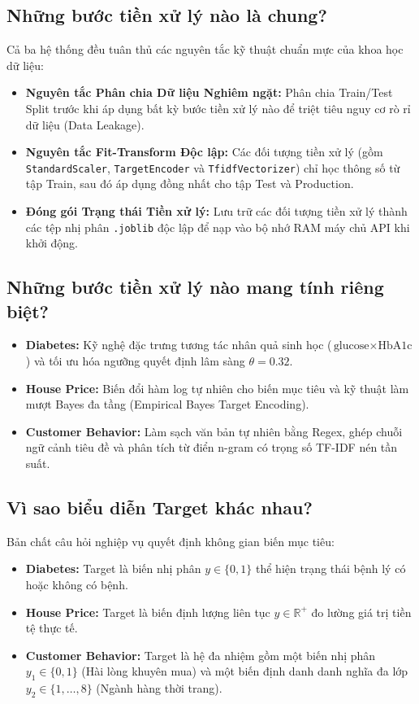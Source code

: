 \documentclass[12pt,a4paper]{report}
\begin{document}
\subsection{Những bước tiền xử lý nào là chung?}
Cả ba hệ thống đều tuân thủ các nguyên tắc kỹ thuật chuẩn mực của khoa học dữ liệu:
\begin{itemize}[leftmargin=2em]
    \item \textbf{Nguyên tắc Phân chia Dữ liệu Nghiêm ngặt:} Phân chia Train/Test Split trước khi áp dụng bất kỳ bước tiền xử lý nào để triệt tiêu nguy cơ rò rỉ dữ liệu (Data Leakage).
    \item \textbf{Nguyên tắc Fit-Transform Độc lập:} Các đối tượng tiền xử lý (gồm \texttt{StandardScaler}, \texttt{TargetEncoder} và \texttt{TfidfVectorizer}) chỉ học thông số từ tập Train, sau đó áp dụng đồng nhất cho tập Test và Production.
    \item \textbf{Đóng gói Trạng thái Tiền xử lý:} Lưu trữ các đối tượng tiền xử lý thành các tệp nhị phân \texttt{.joblib} độc lập để nạp vào bộ nhớ RAM máy chủ API khi khởi động.
\end{itemize}

\subsection{Những bước tiền xử lý nào mang tính riêng biệt?}
\begin{itemize}[leftmargin=2em]
    \item \textbf{Diabetes:} Kỹ nghệ đặc trưng tương tác nhân quả sinh học ($\text{glucose} \times \text{HbA1c}$) và tối ưu hóa ngưỡng quyết định lâm sàng $\theta = 0.32$.
    \item \textbf{House Price:} Biến đổi hàm log tự nhiên cho biến mục tiêu và kỹ thuật làm mượt Bayes đa tầng (Empirical Bayes Target Encoding).
    \item \textbf{Customer Behavior:} Làm sạch văn bản tự nhiên bằng Regex, ghép chuỗi ngữ cảnh tiêu đề và phân tích từ điển n-gram có trọng số TF-IDF nén tần suất.
\end{itemize}

\subsection{Vì sao biểu diễn Target khác nhau?}
Bản chất câu hỏi nghiệp vụ quyết định không gian biến mục tiêu:
\begin{itemize}[leftmargin=2em]
    \item \textbf{Diabetes:} Target là biến nhị phân $y \in \{0, 1\}$ thể hiện trạng thái bệnh lý có hoặc không có bệnh.
    \item \textbf{House Price:} Target là biến định lượng liên tục $y \in \mathbb{R}^+$ đo lường giá trị tiền tệ thực tế.
    \item \textbf{Customer Behavior:} Target là hệ đa nhiệm gồm một biến nhị phân $y_1 \in \{0, 1\}$ (Hài lòng khuyên mua) và một biến định danh danh nghĩa đa lớp $y_2 \in \{1, \dots, 8\}$ (Ngành hàng thời trang).
\end{itemize}
\end{document}

